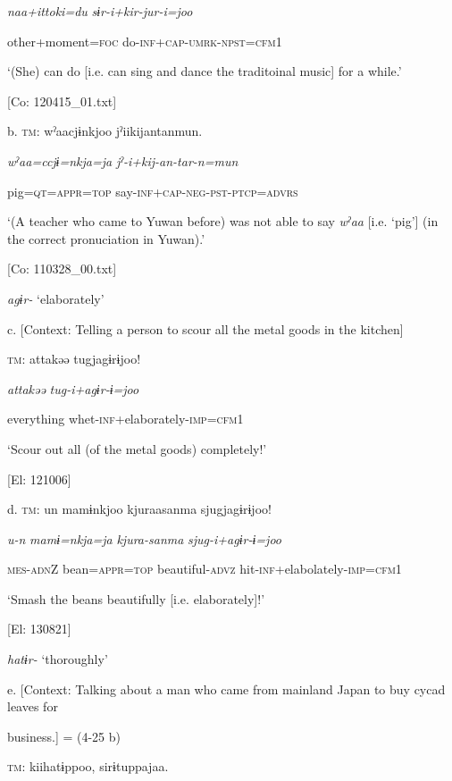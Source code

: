       \textit{naa+ittoki=du}  \textit{sɨr-i+kir{}-jur-i=joo}

      other+moment=\textsc{foc}  do-\textsc{inf}+\textsc{cap}-\textsc{umrk}-\textsc{npst}=\textsc{cfm}1

      ‘(She) can do [i.e. can sing and dance the traditoinal music] for a while.’

      [Co: 120415\_01.txt]

  b.  \textsc{tm}:  wˀaacjɨnkjoo  jˀiikijantanmun.

      \textit{wˀaa=ccjɨ=nkja=ja}  \textit{jˀ-i+kij{}-an-tar-n=mun}

      pig=\textsc{qt}=\textsc{appr}=\textsc{top}  say-\textsc{inf}+\textsc{cap}-\textsc{neg}-\textsc{pst}-\textsc{ptcp}=\textsc{advrs}

      ‘(A teacher who came to Yuwan before) was not able to say \textit{wˀaa} [i.e. ‘pig’] (in the correct pronuciation in Yuwan).’

      [Co: 110328\_00.txt]

  \textit{agɨr-} ‘elaborately’

  c.  [Context: Telling a person to scour all the metal goods in the kitchen]

    \textsc{tm}:  attakəə  tugjagɨrɨjoo!

      \textit{attakəə}  \textit{tug-i+agɨr{}-ɨ=joo}

      everything  whet-\textsc{inf}+elaborately-\textsc{imp}=\textsc{cfm}1

      ‘Scour out all (of the metal goods) completely!’

      [El: 121006]

  d.  \textsc{tm}:  un  mamɨnkjoo  kjuraasanma  sjugjagɨrɨjoo!

      \textit{u-n}  \textit{mamɨ=nkja=ja}  \textit{kjura-sanma}  \textit{sjug-i+agɨr{}-ɨ=joo}

      \textsc{mes}-\textsc{adn}Z  bean=\textsc{appr}=\textsc{top}  beautiful{}-\textsc{advz}  hit{}-\textsc{inf}+elabolately{}-\textsc{imp}=\textsc{cfm}1

      ‘Smash the beans beautifully [i.e. elaborately]!’

      [El: 130821]

  \textit{hatɨr-} ‘thoroughly’

  e.  [Context: Talking about a man who came from mainland Japan to buy cycad leaves for

business.] = (4-25 b)

    \textsc{tm}:  kiihatɨppoo,  sirɨtuppajaa.

